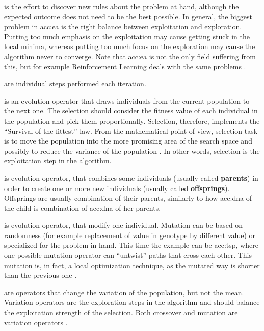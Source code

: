  is the effort to discover new rules about the problem at hand, although the expected outcome does not need to be the best possible. In general, the biggest problem in \acrshort{acc:ea} is the right balance between exploitation and exploration. Putting too much emphasis on the exploitation may cause getting stuck in the local minima, whereas putting too much focus on the exploration may cause the algorithm never to converge. Note that \acrshort{acc:ea} is not the only field suffering from this, but for example Reinforcement Learning deals with the same problems \citep{ExplorationExploitationDilemaRL}. 

 are individual steps performed each iteration.

 is an evolution operator that draws individuals from the current population to the next one. The selection should consider the fitness value of each individual in the population and pick them proportionally. Selection, therefore, implements the \enquote{Survival of the fittest} law. From the mathematical point of view, selection task is to move the population into the more promising area of the search space and possibly to reduce the variance of the population \citep{SelfAdaptiveFeaturesInRealParameterEvolutionaryAlgorithms}. In other words, selection is the exploitation step in the algorithm.

 is evolution operator, that combines some individuals (usually called \textbf{parents}) in order to create one or more new individuals (usually called \textbf{offsprings}). Offsprings are usually combination of their parents, similarly to how \acrshort{acc:dna} of the child is combination of \acrshort{acc:dna} of her parents.

 is evolution operator, that modify one individual. Mutation can be based on randomness (for example replacement of value in genotype by different value) or specialized for the problem in hand. This time the example can be \acrlong{acc:tsp}, where one possible mutation operator can \enquote{untwist} paths that cross each other. This mutation is, in fact, a local optimization technique, as the mutated way is shorter than the previous one \citep{TSPArticle}.

 are operators that change the variation of the population, but not the mean. Variation operators are the exploration steps in the algorithm and should balance the exploitation strength of the selection. Both crossover and mutation are variation operators \citep{SelfAdaptiveFeaturesInRealParameterEvolutionaryAlgorithms}.

